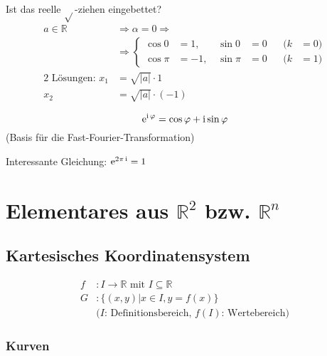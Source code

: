 \begin{note}
	Ist das reelle $\sqrt{}$-ziehen eingebettet?
	\begin{align*}
		a \in \mathbb{R} &\Rightarrow \alpha = 0 \Rightarrow \\
		&\Rightarrow \left\{\begin{aligned}
			\cos 0 &= 1 \text{, } & \sin 0 &= 0 && (k &= 0) \\
			\cos \pi &= -1 \text{, } & \sin \pi &= 0 && (k &= 1)
		\end{aligned}\right. \\
		\text{2 Lösungen: } x_1 &= \sqrt{|a|} \cdot 1 \\
		x_2 &= \sqrt{|a|} \cdot (-1)
	\end{align*}
\end{note}
\begin{note}
	\begin{equation*}\operatorname{e}^{\operatorname{i} \varphi} =\cos \varphi + \operatorname{i} \sin \varphi\end{equation*}(Basis für die Fast-Fourier-Transformation)
\end{note}
\begin{note}Interessante Gleichung: $\operatorname{e}^{2\pi\operatorname{i}} = 1$\end{note}

\section{Elementares aus $\mathbb{R}^2$ bzw. $\mathbb{R}^n$}

\subsection{Kartesisches Koordinatensystem}
\begin{definition}
	\begin{align*}
		f &: I \rightarrow \mathbb{R} \text{ mit }I \subseteq \mathbb{R} \\
		G &: \{(x,y) | x \in I, y = f(x)\} \\
		& \text{($I$: Definitionsbereich, $f(I)$: Wertebereich)}
	\end{align*}
\end{definition}

\subsubsection*{Kurven}

